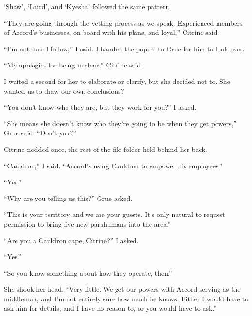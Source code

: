 `Shaw', `Laird', and `Kyesha' followed the same pattern.



``They are going through the vetting process as we speak.  Experienced members of Accord's businesses, on board with his plans, and loyal,'' Citrine said.



``I'm not sure I follow,'' I said.  I handed the papers to Grue for him to look over.



``My apologies for being unclear,'' Citrine said.



I waited a second for her to elaborate or clarify, but she decided not to.  She wanted us to draw our own conclusions?



``You don't know who they are, but they work for you?'' I asked.



``She means she doesn't know who they're going to be when they get powers,'' Grue said.  ``Don't you?''



Citrine nodded once, the rest of the file folder held behind her back.



``Cauldron,'' I said.  ``Accord's using Cauldron to empower his employees.''



``Yes.''



``Why are you telling us this?'' Grue asked.



``This is your territory and we are your guests.  It's only natural to request permission to bring five new parahumans into the area.''



``Are you a Cauldron cape, Citrine?'' I asked.



``Yes.''



``So you know something about how they operate, then.''



She shook her head.  ``Very little.  We get our powers with Accord serving as the middleman, and I'm not entirely sure how much he knows.  Either I would have to ask him for details, and I have no reason to, or you would have to ask.''



